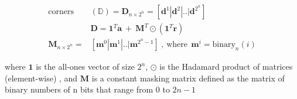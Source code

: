 \begin{equation}
\begin{aligned} 
\text{corners}&(\mathbb{D}) = \mathbf{D}_{n\times 2^{n}} = \left[\mathbf{d}^{1} | \mathbf{d}^{2} |.. | \mathbf{d}^{2^{n}}\right] \\
&\mathbf{D} = \mathbf{1}^{T}\mathbf{a}~ +~ \mathbf{M}^{T} \odot (\mathbf{1}^{T}\mathbf{r}) \\
\mathbf{M}_{n\times 2^{n}} = &\left[ \mathbf{m}^{0}| \mathbf{m}^{1} |.. | \mathbf{m}^{2^{n}-1} \right] ~, ~ \text{where}~~ \mathbf{m}^{i} = \text{binary}_{n}(i)
\label{eq:n-corners}
\end{aligned}
\end{equation}

where $\mathbf{1}$ is the all-ones vector of size $2^{n}$, $\odot$ is the Hadamard product of matrices (element-wise) , and $\mathbf{M}$ is a constant  masking matrix defined as the matrix of binary numbers of n bits that range from 0 to $2{n} - 1 $
